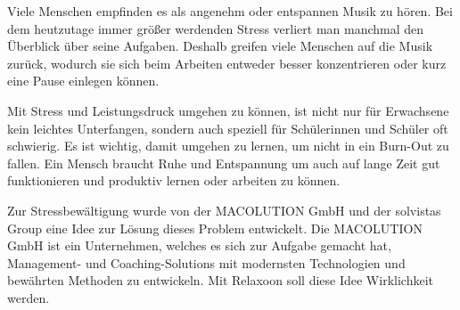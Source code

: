\begin{spacing}{1}
    
    Viele Menschen empfinden es als angenehm oder entspannen Musik zu hören. Bei dem heutzutage immer größer 
    werdenden Stress verliert man manchmal den Überblick über seine Aufgaben. Deshalb greifen viele Menschen
    auf die Musik zurück, wodurch sie sich beim Arbeiten entweder besser konzentrieren oder kurz 
    eine Pause einlegen können.

    Mit Stress und Leistungsdruck umgehen zu können, ist nicht nur für Erwachsene kein leichtes Unterfangen,
    sondern auch speziell für Schülerinnen und Schüler oft schwierig. Es ist wichtig, damit umgehen zu lernen,
    um nicht in ein Burn-Out zu fallen. Ein Mensch braucht Ruhe und Entspannung um auch auf lange Zeit gut 
    funktionieren und produktiv lernen oder arbeiten zu können. 

    Zur Stressbewältigung wurde von der MACOLUTION GmbH und der solvistas Group eine Idee zur Lösung dieses 
    Problem entwickelt. Die MACOLUTION GmbH ist ein Unternehmen, welches es sich zur Aufgabe gemacht hat, 
    Management- und Coaching-Solutions mit modernsten Technologien und bewährten Methoden zu entwickeln. 
    \cite{MACOLUTION}
    Mit Relaxoon soll diese Idee Wirklichkeit werden.

\end{spacing}